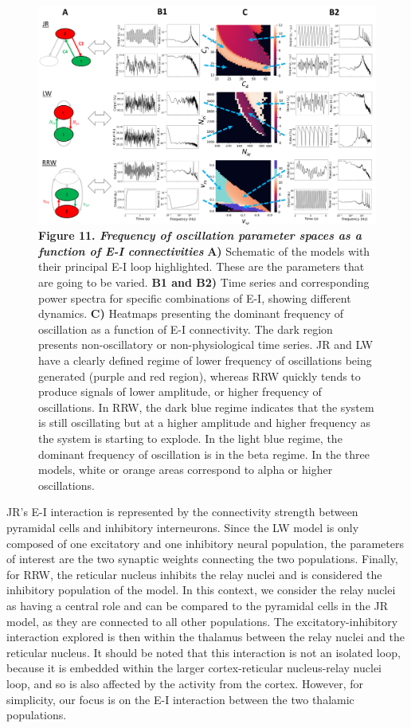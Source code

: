 \documentclass[12pt,twoside]{article}
\begin{document}
\begin{figure}[H]
    \centering
    \includegraphics[width=\linewidth]{Images/Connectivity_5.png}
    \caption*{\textbf{Figure 11.  \textit{Frequency of oscillation parameter spaces as a function of E-I connectivities}} \textbf{A)} Schematic of the models with their principal E-I loop highlighted. These are the parameters that are going to be varied. \textbf{B1 and B2)} Time series and corresponding power spectra for specific combinations of E-I, showing different dynamics. \textbf{C)} Heatmaps presenting the dominant frequency of oscillation as a function of E-I connectivity. The dark region presents non-oscillatory or non-physiological time series. JR and LW have a clearly defined regime of lower frequency of oscillations being generated (purple and red region), whereas RRW quickly tends to produce signals of lower amplitude, or higher frequency of oscillations. In RRW, the dark blue regime indicates that the system is still oscillating but at a higher amplitude and higher frequency as the system is starting to explode. In the light blue regime, the dominant frequency of oscillation is in the beta regime. In the three models, white or orange areas correspond to alpha or higher oscillations.} \label{fig:All_EI_Together}
\end{figure}
JR's E-I interaction is represented by the connectivity strength between pyramidal cells and inhibitory interneurons. Since the LW model is only composed of one excitatory and one inhibitory neural population, the parameters of interest are the two synaptic weights connecting the two populations. Finally, for RRW, the reticular nucleus inhibits the relay nuclei and is considered the inhibitory population of the model. In this context, we consider the relay nuclei as having a central role and can be compared to the pyramidal cells in the JR model, as they are connected to all other populations. The excitatory-inhibitory interaction explored is then within the thalamus between the relay nuclei and the reticular nucleus. It should be noted that this interaction is not an isolated loop, because it is embedded within the larger cortex-reticular nucleus-relay nuclei loop, and so is also affected by the activity from the cortex. However, for simplicity, our focus is on the E-I interaction between the two thalamic populations.
\end{document}
